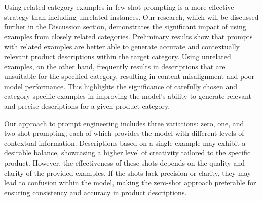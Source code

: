 Using related category examples in few-shot prompting is a more effective strategy than including unrelated instances. Our research, which will be discussed further in the Discussion section, demonstrates the significant impact of using examples from closely related categories. Preliminary results show that prompts with related examples are better able to generate accurate and contextually relevant product descriptions within the target category. Using unrelated examples, on the other hand, frequently results in descriptions that are unsuitable for the specified category, resulting in content misalignment and poor model performance. This highlights the significance of carefully chosen and category-specific examples in improving the model's ability to generate relevant and precise descriptions for a given product category.

Our approach to prompt engineering includes three variations: zero, one, and two-shot prompting, each of which provides the model with different levels of contextual information. Descriptions based on a single example may exhibit a desirable balance, showcasing a higher level of creativity tailored to the specific product. However, the effectiveness of these shots depends on the quality and clarity of the provided examples. If the shots lack precision or clarity, they may lead to confusion within the model, making the zero-shot approach preferable for ensuring consistency and accuracy in product descriptions.

\begin{center}
	\par
\end{center}




